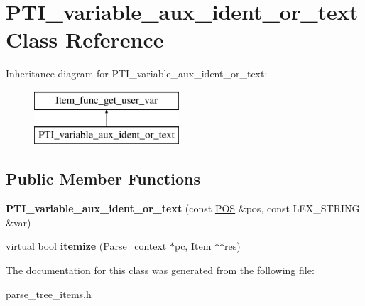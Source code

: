 \hypertarget{classPTI__variable__aux__ident__or__text}{}\section{P\+T\+I\+\_\+variable\+\_\+aux\+\_\+ident\+\_\+or\+\_\+text Class Reference}
\label{classPTI__variable__aux__ident__or__text}
Inheritance diagram for P\+T\+I\+\_\+variable\+\_\+aux\+\_\+ident\+\_\+or\+\_\+text\+:\begin{figure}[H]
\begin{center}
\leavevmode
\includegraphics[height=2.000000cm]{classPTI__variable__aux__ident__or__text}
\end{center}
\end{figure}
\subsection*{Public Member Functions}
\begin{DoxyCompactItemize}
\item 
\mbox{\label{classPTI__variable__aux__ident__or__text_a0fb3be0eb66150363c6f8fa1be0bdf95}} 
{\bfseries P\+T\+I\+\_\+variable\+\_\+aux\+\_\+ident\+\_\+or\+\_\+text} (const \mbox{\hyperlink{structYYLTYPE}{P\+OS}} \&pos, const L\+E\+X\+\_\+\+S\+T\+R\+I\+NG \&var)
\item 
\mbox{\label{classPTI__variable__aux__ident__or__text_a51cc0e9d529fd35d57b7bb215617242a}} 
virtual bool {\bfseries itemize} (\mbox{\hyperlink{structParse__context}{Parse\+\_\+context}} $\ast$pc, \mbox{\hyperlink{classItem}{Item}} $\ast$$\ast$res)
\end{DoxyCompactItemize}


The documentation for this class was generated from the following file\+:\begin{DoxyCompactItemize}
\item 
parse\+\_\+tree\+\_\+items.\+h\end{DoxyCompactItemize}
